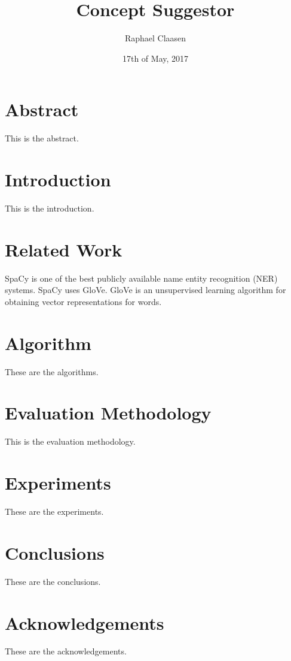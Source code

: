\documentclass{article}
\title{Concept Suggestor}
\date{17th of May, 2017}
\author{Raphael Claasen}
\begin{document}
\maketitle

\section*{Abstract}

This is the abstract.

\section{Introduction}

This is the introduction.

\section{Related Work}

SpaCy is one of the best publicly available name entity recognition (NER) systems. \cite{jiang2016evaluating} SpaCy uses GloVe. GloVe is an unsupervised learning algorithm for obtaining vector representations for words.\cite{pennington2014glove}

\section{Algorithm}

These are the algorithms.

\section{Evaluation Methodology}

This is the evaluation methodology.

\section{Experiments}

These are the experiments.

\section{Conclusions}

These are the conclusions.

\section{Acknowledgements}

These are the acknowledgements.

\printbibliography
\end{document}
